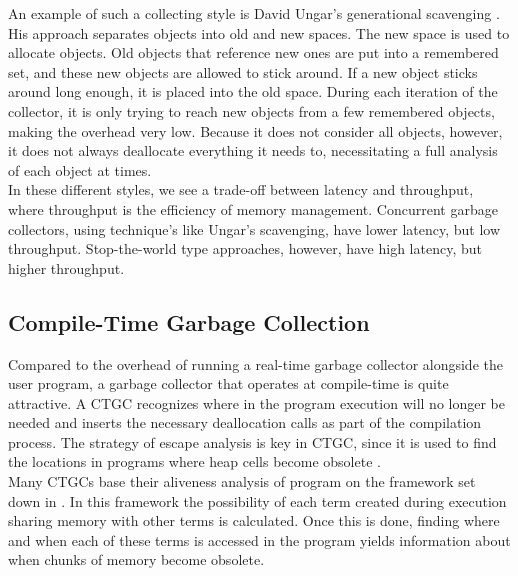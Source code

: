 \documentclass[12pt]{article}
\begin{document}
An example of such a collecting style is David Ungar's generational scavenging \cite{ungar}. His approach separates objects into old and new spaces. The new space is used to allocate objects. Old objects that reference new ones are put into a remembered set, and these new objects are allowed to stick around. If a new object sticks around long enough, it is placed into the old space. During each iteration of the collector, it is only trying to reach new objects from a few remembered objects, making the overhead very low. Because it does not consider all objects, however, it does not always deallocate everything it needs to, necessitating a full analysis of each object at times.\\

In these different styles,  we see a trade-off between latency and throughput, where throughput is the efficiency of memory management. Concurrent garbage collectors, using technique's like Ungar's scavenging, have lower latency, but low throughput. Stop-the-world type approaches, however, have high latency, but higher throughput.

\subsection{Compile-Time Garbage Collection}
Compared to the overhead of running a real-time garbage collector alongside the user program, a garbage collector that operates at compile-time is quite attractive. A CTGC recognizes where in the program execution will no longer be needed and inserts the necessary deallocation calls as part of the compilation process. The strategy of escape analysis is key in CTGC, since it is used to find the locations in programs where heap cells become obsolete \cite{mercury}.\\

Many CTGCs base their aliveness analysis of program on the framework set down in \cite{bruynooghe}. In this framework the possibility of each term created during execution sharing memory with other terms is calculated. Once this is done, finding where and when each of these terms is accessed in the program yields information about when chunks of memory become obsolete. 
\end{document}
